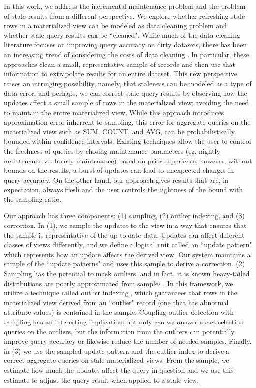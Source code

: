 In this work, we address the incremental maintenance problem and the problem of stale results from a different perspective.
We explore whether refreshing stale rows in a materialized view can be modeled as data cleaning problem and whether stale query results can be ``cleaned".
While much of the data cleaning literature focuses on improving query accuracy on dirty datasets,
there has been an increasing trend of considering the costs of data cleaning \cite{wang1999sample}.
In particular, these approaches clean a small, representative sample of records and then use that information to extrapolate results for an entire dataset.
This new perspective raises an intruiging possibility, namely, that staleness can be modeled as a type of data error, 
and perhaps, we can correct stale query results by observing how the updates affect a small sample of rows in the materialized view; 
avoiding the need to maintain the entire materialized view.
While this approach introduces approximation error inherrent to sampling, this error for aggregate queries on the materialized view such as SUM, COUNT, and AVG, 
can be probabilistically bounded within confidence intervals.
Existing techniques allow the user to control the freshness of queries by chosing maintenance parameters (eg. nightly maintenance vs. hourly maintenance) based on prior experience, however, without bounds on the results, a burst of updates can lead to unexpected changes in query accuracy.
On the other hand, our approach gives results that are, in expectation, always fresh and the user controls the tightness of the bound with the sampling ratio.

Our approach has three components: (1) sampling, (2) outlier indexing, and (3) correction. In (1), we sample the updates to the view in a way that ensures that the sample is representative of the up-to-date data. Updates can affect different classes of views differently, and we define a logical unit called an ``update pattern" which represents how an update affects the derived view. Our system maintains a sample of the ``update patterns" and uses this sample to derive a correction. (2) Sampling has the potential to mask outliers, and in fact, it is known
heavy-tailed distributions are poorly approximated from samples \cite{chaudhuri2001overcoming}.
In this framework, we utilize a technique called outlier indexing \cite{chaudhuri2001overcoming}, which guarantees that rows in the materialized view derived from an ``outlier" record (one that has abnormal attribute values) is contained in the sample.
Coupling outlier detection with sampling has an interesting implication; not only can we answer exact selection queries on the outliers, but
the information from the outliers can potentially improve query accuracy or likewise reduce the number of needed samples.
Finally, in (3) we use the sampled update pattern and the outlier index to derive a correct aggregate queries on stale materialized views.
From the sample, we estimate how much the updates affect the query in question and we use this estimate to adjust the query result when applied to a stale view.

